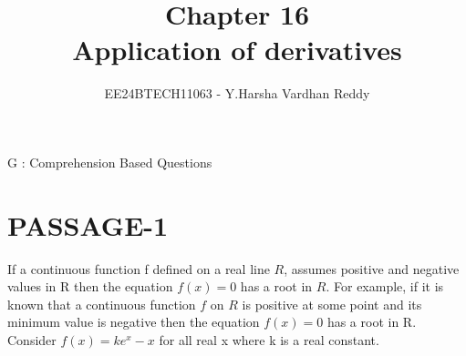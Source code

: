 \documentclass[journal,,12pt,twocolumn]{IEEEtran}
\theoremstyle{remark}
\begin{document}

\vspace{3cm}

\title{Chapter 16\\Application of derivatives}
\author{EE24BTECH11063 - Y.Harsha Vardhan Reddy}
\maketitle
\newpage
\bigskip

\renewcommand{\thefigure}{\theenumi}
\renewcommand{\thetable}{\theenumi}
\begin{flushleft}
\fontsize{18}{20} \selectfont
{G : Comprehension Based Questions}
\end{flushleft}
\section*{PASSAGE-1}
If a continuous function f defined on a real line $R$, assumes positive and negative values in R then the equation $f(x)=0$ has a root in $R$. For example, if it is known that a continuous function $f$ on $R$ is positive at some point and its minimum value is negative then the equation $f(x)=0$ has a root in R.\\
Consider $f(x)=ke^x-x$ for all real x where k is a real constant.
\end{document}
